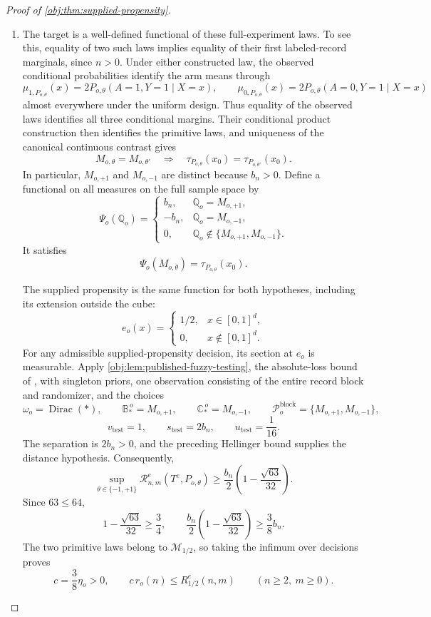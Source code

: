 \documentclass[11pt]{article}
\begin{document}
\begin{proof}[Proof of \cref{obj:thm:supplied-propensity}]
\begin{enumerate}
\item The target is a well-defined functional of these full-experiment laws. To see this, equality of two such laws implies equality of their first labeled-record marginals, since \(n>0\). Under either constructed law, the observed conditional probabilities identify the arm means through
\[
\mu_{1,P_{o,\theta}}(x)
=
2P_{o,\theta}(A=1,Y=1\mid X=x),
\qquad
\mu_{0,P_{o,\theta}}(x)
=
2P_{o,\theta}(A=0,Y=1\mid X=x)
\]
almost everywhere under the uniform design. Thus equality of the observed laws identifies all three conditional margins. Their conditional product construction then identifies the primitive laws, and uniqueness of the canonical continuous contrast gives
\[
M_{o,\theta}=M_{o,\theta'}
\quad\Longrightarrow\quad
\tau_{P_{o,\theta}}(x_0)=\tau_{P_{o,\theta'}}(x_0).
\]
In particular, \(M_{o,+1}\) and \(M_{o,-1}\) are distinct because \(b_n>0\). Define a functional on all measures on the full sample space by
\[
\Psi_o(\mathbb Q_o)=
\begin{cases}
b_n,&\mathbb Q_o=M_{o,+1},\\
-b_n,&\mathbb Q_o=M_{o,-1},\\
0,&\mathbb Q_o\notin\{M_{o,+1},M_{o,-1}\}.
\end{cases}
\]
It satisfies
\[
\Psi_o(M_{o,\theta})=\tau_{P_{o,\theta}}(x_0).
\]

The supplied propensity is the same function for both hypotheses, including its extension outside the cube:
\[
e_o(x)=
\begin{cases}
1/2,&x\in[0,1]^d,\\
0,&x\notin[0,1]^d.
\end{cases}
\]
For any admissible supplied-propensity decision, its section at \(e_o\) is measurable. Apply \cref{obj:lem:published-fuzzy-testing}, the absolute-loss bound of
\citep[Section 3, Lemma 1]{KennedyBalakrishnanRobinsWasserman2024},
with singleton priors, one observation consisting of the entire record block and randomizer, and the choices
\[
\omega_o=\operatorname{Dirac}(*),
\qquad
\mathbb B_*^{\,o}=M_{o,+1},
\qquad
\mathbb C_*^{\,o}=M_{o,-1},
\qquad
\mathcal P_o^{\mathrm{block}}=\{M_{o,+1},M_{o,-1}\},
\]
\[
v_{\mathrm{test}}=1,
\qquad
s_{\mathrm{test}}=2b_n,
\qquad
u_{\mathrm{test}}=\frac1{16}.
\]
The separation is \(2b_n>0\), and the preceding Hellinger bound supplies the distance hypothesis. Consequently,
\[
\sup_{\theta\in\{-1,+1\}}
\mathcal R^e_{n,m}(T^e,P_{o,\theta})
\ge
\frac{b_n}{2}
\left(1-\frac{\sqrt{63}}{32}\right).
\]
Since \(63\le64\),
\[
1-\frac{\sqrt{63}}{32}\ge\frac34,
\qquad
\frac{b_n}{2}
\left(1-\frac{\sqrt{63}}{32}\right)\ge\frac38b_n.
\]
The two primitive laws belong to \(\mathcal M_{1/2}\), so taking the infimum over decisions proves
\[
c=\frac38\eta_o>0,
\qquad
c\,r_o(n)\le R^e_{1/2}(n,m)
\qquad(n\ge2,\ m\ge0).
\]


\end{enumerate}
\end{proof}
\end{document}
